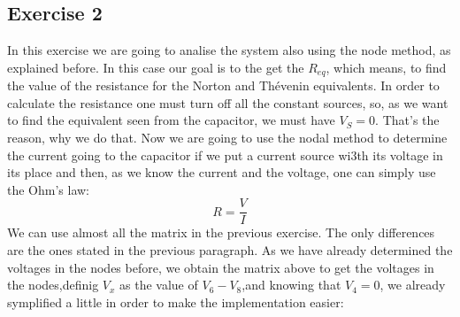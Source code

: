 \subsection{Exercise 2}
In this exercise we are going to analise the system also using the node method, as explained before. In this case our goal is to the get the $R_{eq}$, which means, to find the value of the resistance for the Norton and Thévenin equivalents. In order to calculate the resistance one must turn off all the constant sources, so, as we want to find the equivalent seen from the capacitor, we must have $V_S=0$. That's the reason, why we do that. Now we are going to use the nodal method to determine the current going to the capacitor if we put a current source wi3th its voltage in its place and then, as we know the current and the voltage, one can simply use the Ohm's law:
\begin{equation}
  R=\frac{V}{I}
\end{equation}
We can use almost all the matrix in the previous exercise. The only differences are the ones stated in the previous paragraph. As we have already determined the voltages in the nodes before, we obtain the matrix above to get the voltages in the nodes,definig $V_x$ as the value of $V_6-V_8$,and knowing that $V_4=0$, we already symplified a little in order to make the implementation easier:
